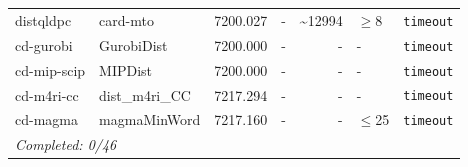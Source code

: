 \begin{longtable}{llrrrl p{}}
distqldpc & card-mto & 7200.027 & - & \textasciitilde{}12994 & $\geq$8 & \texttt{timeout} \\
cd-gurobi & GurobiDist & 7200.000 & - & - & - & \texttt{timeout} \\
cd-mip-scip & MIPDist & 7200.000 & - & - & - & \texttt{timeout} \\
cd-m4ri-cc & dist\_m4ri\_CC & 7217.294 & - & - & - & \texttt{timeout} \\
cd-magma & magmaMinWord & 7217.160 & - & - & $\leq$25 & \texttt{timeout} \\
\midrule
\multicolumn{7}{l}{\textit{Completed: 0/46}} \\
\end{longtable}
